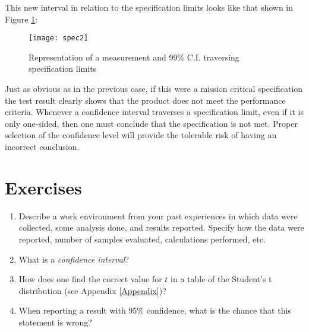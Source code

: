 This new interval in relation to the specification limits looks like that shown in Figure \ref{fig3}:

\begin{figure}[h]\caption{Representation of a measurement and 99\% C.I. traversing specification limits}\label{fig3}
\begin{center}
\texttt{[image: spec2]}
\end{center}
\end{figure}

Just as obvious as in the previous case, if this were a mission critical specification the test result clearly shows that the product does not meet the performance criteria.  Whenever a confidence interval traverses a specification limit, even if it is only one-sided, then one must conclude that the specification is not met.  Proper selection of the confidence level will provide the tolerable risk of having an incorrect conclusion.  
\newpage
\section{Exercises}
\begin{enumerate}
\item Describe a work environment from your past experiences in which data were collected, some analysis done, and results reported.  Specify how the data were reported, number of samples evaluated, calculations performed, etc.

\item What is a \textit{confidence interval}?

\item How does one find the correct value for $ t $ in a table of the Student's t distribution (see Appendix \ref{Appendix})?

\item When reporting a result with 95\% confidence, what is the chance that this statement is wrong?
\end{enumerate}
